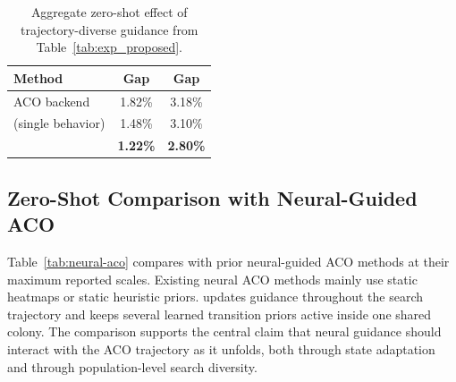\begin{table}[h]
\centering
\caption{Aggregate zero-shot effect of trajectory-diverse guidance from Table~\ref{tab:exp_proposed}.}
\label{tab:trajectory-diverse-effect}
\small
\renewcommand{\arraystretch}{0.85}
\begin{tabular*}{\columnwidth}{@{\extracolsep{\fill}}lcc@{}}
\toprule
Method & \TSP{} Gap & \CVRP{} Gap \\
\midrule
ACO backend & 1.82\%  & 3.18\%  \\
\DyNACO{} (single behavior) & 1.48\% & 3.10\%  \\
\DyNACS{} & \textbf{1.22\%}  & \textbf{2.80\%} \\
\bottomrule
\end{tabular*}
\end{table}

\subsection{Zero-Shot Comparison with Neural-Guided ACO}
\label{sec:neural-aco-comparison}

Table~\ref{tab:neural-aco} compares \DyNACS{} with prior neural-guided ACO methods at their maximum reported scales. Existing neural ACO methods mainly use static heatmaps or static heuristic priors. \DyNACS{} updates guidance throughout the search trajectory and keeps several learned transition priors active inside one shared colony. The comparison supports the central claim that neural guidance should interact with the ACO trajectory as it unfolds, both through state adaptation and through population-level search diversity.


